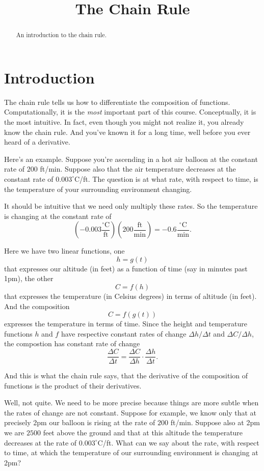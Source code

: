 \documentclass{ximera}
\title{The Chain Rule}
\begin{document}
\begin{abstract}
An introduction to the chain rule.
\end{abstract}
\maketitle


\section{Introduction}
The chain rule tells us how to differentiate the composition of functions. Computationally, it is the \emph{most} important part of this course. Conceptually, it is the most intuitive. In fact, even though you might not realize it, you already know the chain rule. And you've known it for a long time, well before you ever heard of a derivative.

Here's an example. Suppose you're ascending in a hot air balloon at the constant rate of $200$ ft/min. Suppose also that the air temperature decreases at the constant rate of $0.003^\circ$C/ft. The question is at what rate, with respect to time, is the temperature of your surrounding environment changing.

It should be intuitive that we need only multiply these rates. So the temperature is changing at the constant rate of 
\[
    \left( -0.003 \frac{^\circ\text{C}}{\text{ft}}\right) \left(200  \frac{\text{ft}}{\text{min}} \right) = -0.6\frac{^\circ\text{C}}{\text{min}} .
\]

Here we have two linear functions, one 
\[
      h = g(t)
\]
that expresses our altitude (in feet) as a function of time (say in minutes past 1pm), the other
\[
         C = f(h)
\]
that expresses the temperature (in Celsius degrees) in terms of altitude (in feet). And the composition 
\[
    C = f(g(t))
\]
expresses the temperature in terms of time. Since the height and temperature functions $h$ and $f$ have respective constant rates of change $\Delta h/\Delta t$ and $\Delta C/\Delta h$, the compostion has constant rate of change
\[
    \frac{\Delta C}{\Delta t} = \frac{\Delta C}{\Delta h} \cdot \frac{\Delta h}{\Delta t} .
\]

And this is what the chain rule says, that the derivative of the composition of functions is the product of their derivatives.

Well, not quite. We need to be more precise because things are more subtle when the rates of change are not constant. Suppose for example, we know only that at precisely 2pm our balloon is rising at the rate of $200$ ft/min. Suppose also at 2pm we are $2500$ feet above the ground and that at this altitude the temperature decreases at the rate of $0.003^\circ$C/ft. What can we say about the rate, with respect to time, at which the temperature of our surrounding environment is changing at 2pm?
\end{document}

